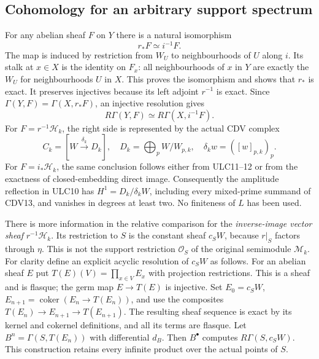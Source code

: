 \documentclass[11pt,a4paper]{article}
\theoremstyle{definition}\newtheorem{definition}[theorem]{Definition}
\begin{document}
\subsection{Cohomology for an arbitrary support spectrum}
For any abelian sheaf $F$ on $Y$ there is a natural isomorphism
\begin{equation}\tag{ULC11}
 r_*F\simeq i^{-1}F.
\end{equation}
The map is induced by restriction from $W_U$ to neighbourhoods
of $U$ along $i$. Its stalk at $x\in X$ is the identity on
$F_x$: all neighbourhoods of $x$ in $Y$ are exactly the $W_U$
for neighbourhoods $U$ in $X$. This proves the isomorphism and
shows that $r_*$ is exact. It preserves injectives because its
left adjoint $r^{-1}$ is exact. Since
$\Gamma(Y,F)=\Gamma(X,r_*F)$, an injective resolution gives
\begin{equation}\tag{ULC12}
 R\Gamma(Y,F)\simeq R\Gamma(X,i^{-1}F).
\end{equation}
For $F=r^{-1}\mathcal H_k$, the right side is represented by the
actual CDV complex
\begin{equation}\tag{ULC13}
 C_k=[W\xrightarrow{\delta_k}D_k],\quad
 D_k=\bigoplus_p W/W_{p,k},\quad
 \delta_kw=([w]_{p,k})_p.
\end{equation}
For $F=i_*\mathcal H_k$, the same conclusion follows either
from ULC11--12 or from the exactness of closed-embedding direct
image. Consequently the amplitude reflection in ULC10 has
$H^1=D_k/\delta_kW$, including every mixed-prime summand of
CDV13, and vanishes in degrees at least two. No finiteness of
$L$ has been used.

There is more information in the relative comparison for the
\emph{inverse-image vector sheaf} $r^{-1}\mathcal H_k$.
Its restriction to $S$ is the constant sheaf $c_SW$, because
$r|_S$ factors through $\eta$. This is not the support restriction
$\mathcal O_S$ of the original semimodule $\mathcal M_k$.
For clarity define an explicit acyclic resolution of $c_SW$ as
follows. For an abelian sheaf $E$ put
$T(E)(V)=\prod_{x\in V}E_x$ with projection restrictions.
This is a sheaf and is flasque; the germ map $E\to T(E)$ is
injective. Set $E_0=c_SW$, $E_{n+1}=\operatorname{coker}(E_n\to T(E_n))$,
and use the composites $T(E_n)\to E_{n+1}\to T(E_{n+1})$.
The resulting sheaf sequence is exact by its kernel and cokernel
definitions, and all its terms are flasque. Let $B^n=\Gamma(S,T(E_n))$
with differential $d_B$. Then $B^\bullet$ computes
$R\Gamma(S,c_SW)$. This construction retains every infinite
product over the actual points of $S$.
\end{document}
